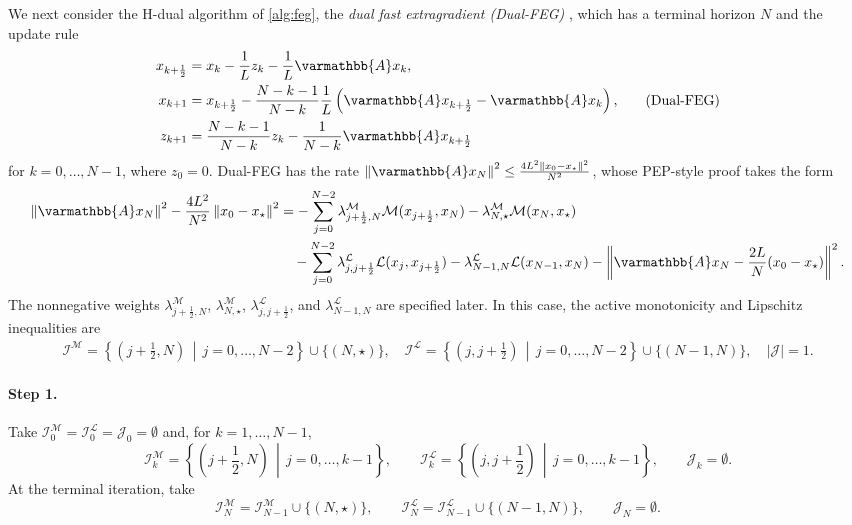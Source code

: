 \documentclass{article}
\theoremstyle{definition}
\theoremstyle{plain}
\newcommand{\cI}{{\mathcal{I}}}
\newcommand{\cJ}{{\mathcal{J}}}
\newcommand{\cL}{{\mathcal{L}}}
\newcommand{\cM}{{\mathcal{M}}}
\newcommand{\opA}{{\varmathbb{A}}}
\newcommand{\sqnorm}[1]{\left\| #1 \right\|^2}
\begin{document}
We next consider the H-dual algorithm of \ref{alg:feg}, the \textit{dual fast extragradient (Dual-FEG)} \cite{YoonKimSuhRyu2024_optimal},
which has a terminal horizon $N$ and the update rule
\begin{align}
\begin{aligned}
    x_{k+\frac12} &= x_k- \frac{1}{L} z_k - \frac{1}{L} \opA x_k, \\
    x_{k+1} &= x_{k+\frac12}-\frac{N-k-1}{N-k} \frac{1}{L} \left(\opA x_{k+\frac12} - \opA x_k\right), \\
    z_{k+1} &= \frac{N-k-1}{N-k}z_k - \frac{1}{N-k}\opA x_{k+\frac12}    
\end{aligned}
\label{alg:dual-feg}
\tag{Dual-FEG}
\end{align}
for $k=0,\dots,N-1$, where $z_0 = 0$.
Dual-FEG has the rate $\sqnorm{\opA x_N}\le \frac{4L^2\sqnorm{x_0-x_\star}}{N^2}$,
whose PEP-style proof takes the form
\begin{align}
\begin{aligned}
    \sqnorm{\opA x_N}-\frac{4L^2}{N^2}\sqnorm{x_0-x_\star}
    &= -\sum_{j=0}^{N-2}\lambda^\cM_{j+\frac12,N}\cM(x_{j+\frac12},x_N)
    -\lambda^\cM_{N,\star}\cM(x_N,x_\star) \\
    &\quad
    -\sum_{j=0}^{N-2}\lambda^\cL_{j,j+\frac12}\cL(x_j,x_{j+\frac12})
    -\lambda^\cL_{N-1,N}\cL(x_{N-1},x_N) 
    -\sqnorm{\opA x_N-\frac{2L}{N}(x_0-x_\star)} .
\end{aligned}
\label{eq:dual_feg_full_pep_certificate}
\end{align}
The nonnegative weights $\lambda^\cM_{j+\frac12,N}$, $\lambda^\cM_{N,\star}$, $\lambda^\cL_{j,j+\frac12}$, and $\lambda^\cL_{N-1,N}$ are specified later.
In this case, the active monotonicity and Lipschitz inequalities are
\[
    \begin{aligned}
        \cI^\cM = \left\{ \left(j+\frac12,N \right)\,\middle|\,j=0,\dots,N-2 \right\}\cup\{(N,\star) \} ,
        \quad
        \cI^\cL = \left\{\left( j, j+\frac12 \right)\,\middle|\,j=0,\dots,N-2 \right\}\cup\{(N-1,N) \} ,
        \quad
        |\cJ| = 1 .
    \end{aligned}
\]

\paragraph{Step 1.}
Take $\cI_0^\cM=\cI_0^\cL=\cJ_0=\emptyset$ and, for $k=1,\dots,N-1$,
\[
    \cI_k^\cM = \left\{ \left(j+\frac12,N \right)\,\middle|\, j=0,\dots,k-1 \right\},
    \qquad
    \cI_k^\cL = \left\{\left( j, j+\frac12 \right)\,\middle|\, j=0,\dots,k-1 \right\},
    \qquad
    \cJ_k=\emptyset .
\]
At the terminal iteration, take
\[
    \cI_N^\cM = \cI_{N-1}^\cM\cup\{(N,\star)\},
    \qquad
    \cI_N^\cL=\cI_{N-1}^\cL\cup\{(N-1,N)\},
    \qquad
    \cJ_N=\emptyset .
\]
\end{document}
